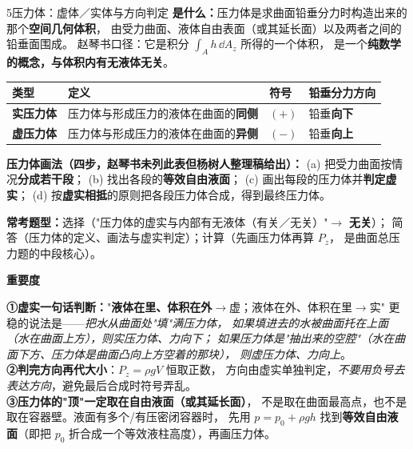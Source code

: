 \begin{kaodian}{5}{压力体：虚体／实体与方向判定}
\textbf{是什么：}压力体是求曲面铅垂分力时构造出来的那个\textbf{空间几何体积}，
由受力曲面、液体自由表面（或其延长面）以及两者之间的铅垂面围成。
赵琴书口径：它是积分 $\int_A h\,\dd A_z$ 所得的一个体积，
是一个\textbf{纯数学的概念，与体积内有无液体无关}。

\begin{center}
\begin{tabularx}{\textwidth}{@{}lXXX@{}}
\toprule
类型 & 定义 & 符号 & 铅垂分力方向 \\
\midrule
\textbf{实压力体} & 压力体与形成压力的液体在曲面的\textbf{同侧} & $(+)$ & 铅垂\textbf{向下} \\
\textbf{虚压力体} & 压力体与形成压力的液体在曲面的\textbf{异侧} & $(-)$ & 铅垂\textbf{向上} \\
\bottomrule
\end{tabularx}
\end{center}

\textbf{压力体画法（四步，赵琴书未列此表但杨树人整理稿给出）：}
(a) 把受力曲面按情况\textbf{分成若干段}；
(b) 找出各段的\textbf{等效自由液面}；
(c) 画出每段的压力体并\textbf{判定虚实}；
(d) 按\textbf{虚实相抵}的原则把各段压力体合成，得到最终压力体。

\textbf{常考题型：}选择（"压力体的虚实与内部有无液体（有关／无关）"$\to$ \textbf{无关}）；
简答（压力体的定义、画法与虚实判定）；计算（先画压力体再算 $P_z$，
是曲面总压力题的中段核心）。

\textbf{重要度 }\quad{}\quad{}

\begin{banfa}
\textbf{①虚实一句话判断：}"\textbf{液体在里、体积在外}$\to$虚；液体在外、体积在里$\to$实"
更稳的说法是——\emph{把水从曲面处"填"满压力体，
如果填进去的水被曲面托在上面（水在曲面上方），则实压力体、力向下；
如果压力体是"抽出来的空腔"（水在曲面下方、压力体是曲面凸向上方空着的那块），
则虚压力体、力向上}。\\
\textbf{②判完方向再代大小}：$P_z=\rho gV$ 恒取正数，
方向由虚实单独判定，\emph{不要用负号去表达方向}，避免最后合成时符号弄乱。\\
\textbf{③压力体的"顶"一定取在自由液面（或其延长面）}，
不是取在曲面最高点，也不是取在容器壁。液面有多个/有压密闭容器时，
先用 $p=p_0+\rho gh$ 找到\textbf{等效自由液面}（即把 $p_0$ 折合成一个等效液柱高度），再画压力体。
\end{banfa}


\end{kaodian}
